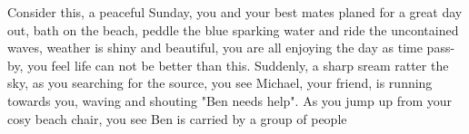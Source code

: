 Consider this, a peaceful Sunday, you and your best mates planed for a great day out, bath on the beach, peddle the blue sparking water and ride the uncontained waves, weather is shiny and beautiful, you are all enjoying the day as time pass-by, you feel life can not be better than this. Suddenly, a sharp sream ratter the sky, as you searching for the source, you see Michael, your friend, is running towards you, waving and shouting "Ben needs help". As you jump up from your cosy beach chair, you see Ben is carried by a group of people